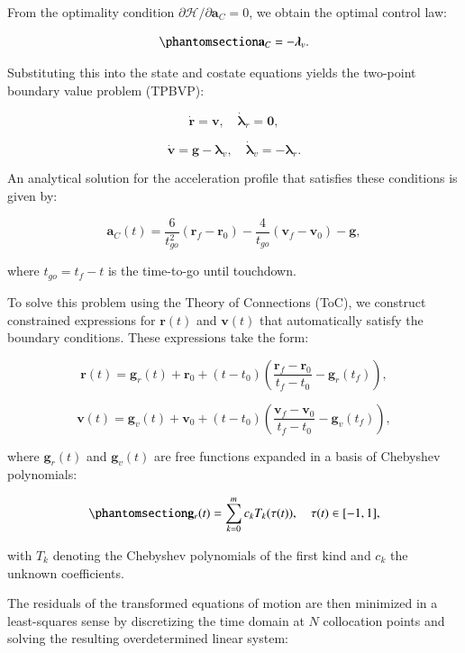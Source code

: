 \documentclass[
  number,
  preprint]{elsarticle}
\begin{document}
From the optimality condition
\(\partial \mathcal{H}/\partial \mathbf{a}_C = 0\), we obtain the
optimal control law:

\begin{equation}\protect\phantomsection\label{eq-ch4-ac}{
\mathbf{a}_C = -\boldsymbol{\lambda}_v.
}\end{equation}

Substituting this into the state and costate equations yields the
two-point boundary value problem (TPBVP):

\[
\dot{\mathbf{r}} = \mathbf{v}, \quad \dot{\boldsymbol{\lambda}}_r = \mathbf{0},
\]

\[
\dot{\mathbf{v}} = \mathbf{g} - \boldsymbol{\lambda}_v, \quad \dot{\boldsymbol{\lambda}}_v = -\boldsymbol{\lambda}_r.
\]

An analytical solution for the acceleration profile that satisfies these
conditions is given by:

\[
\mathbf{a}_C(t) = \frac{6}{t_{go}^2} (\mathbf{r}_f - \mathbf{r}_0) - \frac{4}{t_{go}} (\mathbf{v}_f - \mathbf{v}_0) - \mathbf{g},
\]

where \(t_{go} = t_f - t\) is the time-to-go until touchdown.

To solve this problem using the Theory of Connections (ToC), we
construct constrained expressions for \(\mathbf{r}(t)\) and
\(\mathbf{v}(t)\) that automatically satisfy the boundary conditions.
These expressions take the form:

\[
\mathbf{r}(t) = \mathbf{g}_r(t) + \mathbf{r}_0 + (t - t_0) \left( \frac{\mathbf{r}_f - \mathbf{r}_0}{t_f - t_0} - \mathbf{g}_r(t_f) \right),
\]

\[
\mathbf{v}(t) = \mathbf{g}_v(t) + \mathbf{v}_0 + (t - t_0) \left( \frac{\mathbf{v}_f - \mathbf{v}_0}{t_f - t_0} - \mathbf{g}_v(t_f) \right),
\]

where \(\mathbf{g}_r(t)\) and \(\mathbf{g}_v(t)\) are free functions
expanded in a basis of Chebyshev polynomials:

\begin{equation}\protect\phantomsection\label{eq-ch4-chebyshev}{
\mathbf{g}_r(t) = \sum_{k=0}^{m} c_k T_k(\tau(t)), \quad \tau(t) \in [-1, 1],
}\end{equation}

with \(T_k\) denoting the Chebyshev polynomials of the first kind and
\(c_k\) the unknown coefficients.

The residuals of the transformed equations of motion are then minimized
in a least-squares sense by discretizing the time domain at \(N\)
collocation points and solving the resulting overdetermined linear
system:
\end{document}
